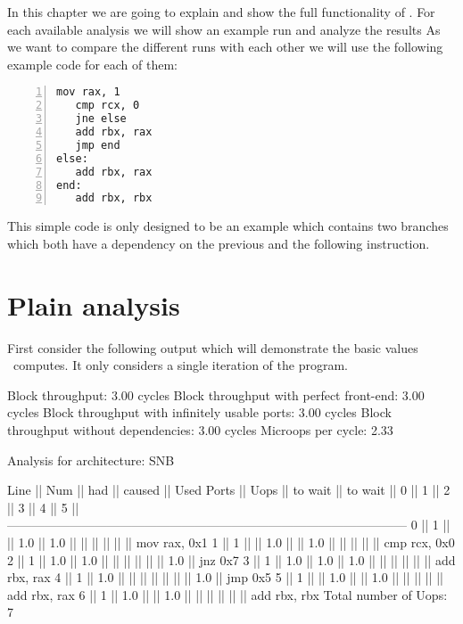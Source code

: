 In this chapter we are going to explain and show the full functionality of \suaca. For each available analysis we will show an example run and analyze the results As we want to compare the different runs with each other we will use the following example code for each of them:

\begin{mdframed}[backgroundcolor=light-gray, roundcorner=10pt,leftmargin=1, rightmargin=1, innerleftmargin=15, innertopmargin=1,innerbottommargin=1, outerlinewidth=1, linecolor=light-gray]
\begin{lstlisting}[language={myLang}, basicstyle=\small, numbers=left]
   mov rax, 1
   cmp rcx, 0
   jne else
   add rbx, rax
   jmp end
else:
   add rbx, rax
end:
   add rbx, rbx
\end{lstlisting}
\end{mdframed}

This simple code is only designed to be an example which contains two branches which both have a dependency on the previous and the following instruction.

\section{Plain analysis}
\label{sec:plain}

First consider the following output which will demonstrate the basic values \suaca\ computes. It only considers a single iteration of the program.


\begin{example}
Block throughput: 3.00 cycles
Block throughput with perfect front-end: 3.00 cycles
Block throughput with infinitely usable ports: 3.00 cycles
Block throughput without dependencies: 3.00 cycles
Microops per cycle: 2.33

Analysis for architecture: SNB

 Line  ||   Num   ||   had   || caused  ||            Used Ports
       ||   Uops  || to wait || to wait ||   0   ||   1   ||   2   ||   3   ||   4   ||   5   ||
 ------------------------------------------------------------------------------------------------
   0   ||    1    ||         ||   1.0   ||  1.0  ||       ||       ||       ||       ||       || mov rax, 0x1
   1   ||    1    ||         ||   1.0   ||       ||  1.0  ||       ||       ||       ||       || cmp rcx, 0x0
   2   ||    1    ||   1.0   ||   1.0   ||       ||       ||       ||       ||       ||  1.0  || jnz 0x7
   3   ||    1    ||   1.0   ||   1.0   ||  1.0  ||       ||       ||       ||       ||       || add rbx, rax
   4   ||    1    ||   1.0   ||         ||       ||       ||       ||       ||       ||  1.0  || jmp 0x5
   5   ||    1    ||         ||   1.0   ||       ||  1.0  ||       ||       ||       ||       || add rbx, rax
   6   ||    1    ||   1.0   ||         ||  1.0  ||       ||       ||       ||       ||       || add rbx, rbx
Total number of Uops: 7
\end{example}


